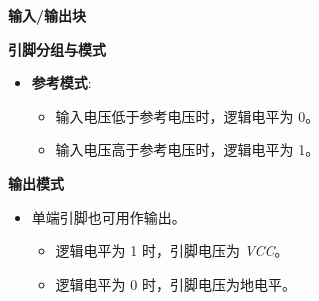 \begin{frame}[allowframebreaks]{\textbf{输入/输出块}}
\begin{block}{\textbf{引脚分组与模式}}
\begin{itemize}
    \begin{itemize}
    \tightlist
    \item
    引脚 P 的电压低于引脚 N 时，逻辑电平为 0。
    \item
    引脚 P 的电压高于引脚 N 时，逻辑电平为 1。
    \end{itemize}
\item
    \textbf{参考模式}:

    \begin{itemize}
    \tightlist
    \item
    输入电压低于参考电压时，逻辑电平为 0。
    \item
    输入电压高于参考电压时，逻辑电平为 1。
    \end{itemize}
\end{itemize}
\end{block}

\begin{block}{\textbf{输出模式}}
\begin{itemize}
\tightlist
\item
    单端引脚也可用作输出。

    \begin{itemize}
    \tightlist
    \item
    逻辑电平为 1 时，引脚电压为 \emph{VCC}。
    \item
    逻辑电平为 0 时，引脚电压为地电平。
    \end{itemize}
\end{itemize}
\end{block}
\end{frame}

